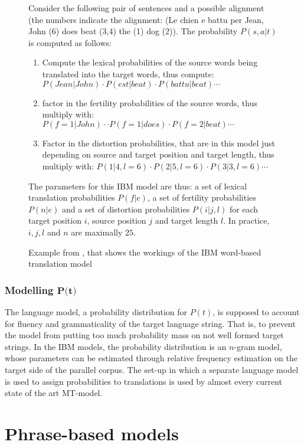 \begin{figure}[!ht]
\begin{framed}
\scriptsize{
Consider the following pair of sentences and a possible alignment (the numbers indicate the alignment: (Le chien e battu per Jean, John (6) does beat (3,4) the (1) dog (2)). The probability $P(s,a|t)$ is computed as follows:\begin{enumerate}
\item Compute the lexical probabilities of the source words being translated into the target words, thus compute: $P(Jean|John)\cdot P(est|beat)\cdot P(battu|beat)\cdots$
\item factor in the fertility probabilities of the source words, thus multiply with:  $P(f\!=\!1|John)\cdot \cdot P(f\!=\!1|does) \cdot P(f\!=\!2|beat)\cdots $
\item Factor in the distortion probabilities, that are in this model just depending on source and target position and target length, thus multiply with: $P(1|4,l\!=\!6)\cdot P(2|5,l\!=\!6)\cdot P(3|3,l\!=\!6) \cdots $
\end{enumerate}
The parameters for this IBM model are thus: a set of lexical translation probabilities $P(f|e)$, a set of fertility probabilities $P(n|e)$ and a set of distortion probabilities $P(i|j,l)$ for each target position $i$, source position $j$ and target length $l$. In practice, $i,j,l$ and $n$ are maximally $25$.
}
\end{framed}
\caption{Example from \cite[p.3]{brown1990statistical}, that shows the workings of the IBM word-based translation model}\label{fig:IBM-model}
\end{figure}


\subsubsection{Modelling $\mathbf{P(t})$}
The language model, a probability distribution for $P(t)$, is supposed to account for fluency and grammaticality of the target language string. That is, to prevent the model from putting too much probability mass on not well formed target strings. In the IBM models, the probability distribution is an $n$-gram model, whose parameters can be estimated through relative frequency estimation on the target side of the parallel corpus. The set-up in which a separate language model is used to assign probabilities to translations is used by almost every current state of the art MT-model.


\section{Phrase-based models}
\label{sec:pbmodels}


